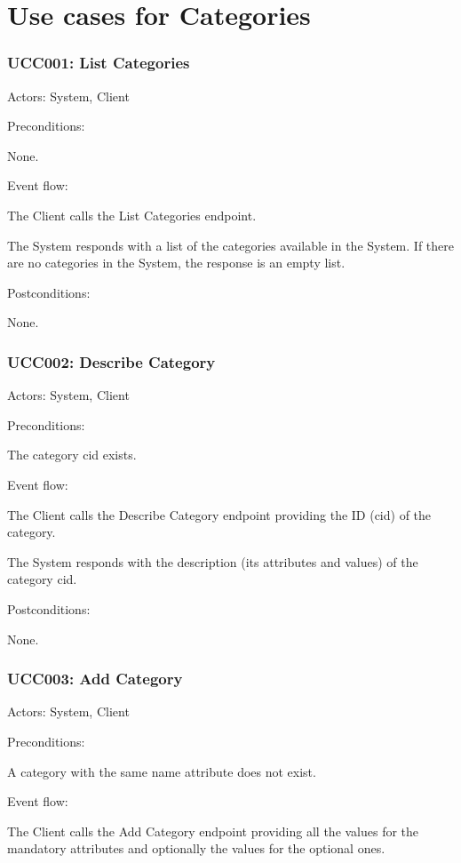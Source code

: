 \section{Use cases for Categories}

\subsubsection{UCC001: List Categories}
\label{UCC001}

Actors: System, Client

Preconditions: 

\ucitem None.

Event flow:

\ucitem The Client calls the List Categories endpoint.

\ucitem The System responds with a list of the categories available in the System. If there are no categories in the System, the response is an empty list.

Postconditions: 

\ucitem None.

\subsubsection{UCC002: Describe Category}
\label{UCC002}

Actors: System, Client

Preconditions: 

\ucitem The category cid exists.

Event flow:

\ucitem The Client calls the Describe Category endpoint providing the ID (cid) of the category.

\ucitem The System responds with the description (its attributes and values) of the category cid.

Postconditions:

\ucitem None.

\subsubsection{UCC003: Add Category}
\label{UCC003}

Actors: System, Client

Preconditions: 

\ucitem A category with the same name attribute does not exist.

Event flow:

\ucitem The Client calls the Add Category endpoint providing all the values for the mandatory attributes and optionally the values for the optional ones.

